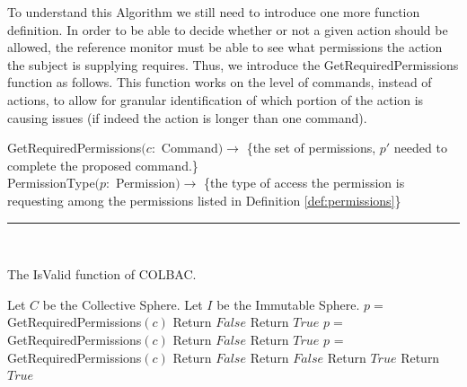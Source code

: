 To understand this Algorithm we still need to introduce one more function
definition. In order to be able to decide whether or not a given action should
be allowed, the reference monitor must be able to see what permissions the
action the subject is supplying requires. Thus, we introduce the
GetRequiredPermissions function as follows. This function works on the level of
commands, instead of actions, to allow for granular identification of which
portion of the action is causing issues (if indeed the action is longer than one
command).

\begin{definition}
GetRequiredPermissions$(c:$ Command$) \rightarrow$ \{the set of permissions,
$p'$ needed to complete the proposed command.\}\\
PermissionType$(p:$ Permission$) \rightarrow $ \{the type of access the
permission is requesting among the permissions listed in Definition
\ref{def:permissions}\}\\
\hrule\mbox{}\\
\end{definition}

\begin{algorithm}
\caption{The IsValid function of COLBAC.}
\label{alg:isvalid}
\begin{algorithmic}[1]
\State Let $C$ be the Collective Sphere.
\State Let $I$ be the Immutable Sphere.
         
            \State $p =$ GetRequiredPermissions$(c)$
                \State Return $False$
            \EndIf
        \EndFor
        \State Return $True$
    \Else
        \State $p =$ GetRequiredPermissions$(c)$
            \State Return $False$
        \EndIf
        \State Return $True$
    \EndIf
{}
     
        \State $p$ = GetRequiredPermissions$(c)$
            \State Return $False$
                \State Return $False$
            \EndIf
            \State Return $True$
        \Else {}
            \State Return $True$
        \EndIf
    \EndFor
\EndIf
\EndProcedure
\end{algorithmic}
\end{algorithm}

